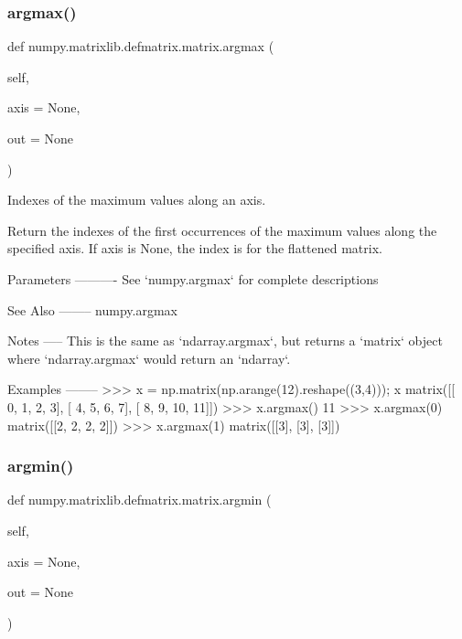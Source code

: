 \subsubsection{\texorpdfstring{argmax()}{argmax()}}
{\footnotesize\ttfamily def numpy.\+matrixlib.\+defmatrix.\+matrix.\+argmax (\begin{DoxyParamCaption}\item[{}]{self,  }\item[{}]{axis = {\ttfamily None},  }\item[{}]{out = {\ttfamily None} }\end{DoxyParamCaption})}

\begin{DoxyVerb}Indexes of the maximum values along an axis.

Return the indexes of the first occurrences of the maximum values
along the specified axis.  If axis is None, the index is for the
flattened matrix.

Parameters
----------
See `numpy.argmax` for complete descriptions

See Also
--------
numpy.argmax

Notes
-----
This is the same as `ndarray.argmax`, but returns a `matrix` object
where `ndarray.argmax` would return an `ndarray`.

Examples
--------
>>> x = np.matrix(np.arange(12).reshape((3,4))); x
matrix([[ 0,  1,  2,  3],
[ 4,  5,  6,  7],
[ 8,  9, 10, 11]])
>>> x.argmax()
11
>>> x.argmax(0)
matrix([[2, 2, 2, 2]])
>>> x.argmax(1)
matrix([[3],
[3],
[3]])\end{DoxyVerb}
 \mbox{\label{classnumpy_1_1matrixlib_1_1defmatrix_1_1matrix_ad6c00839e0d621fb99a4b47bcc0edf72}} 
\subsubsection{\texorpdfstring{argmin()}{argmin()}}
{\footnotesize\ttfamily def numpy.\+matrixlib.\+defmatrix.\+matrix.\+argmin (\begin{DoxyParamCaption}\item[{}]{self,  }\item[{}]{axis = {\ttfamily None},  }\item[{}]{out = {\ttfamily None} }\end{DoxyParamCaption})}

